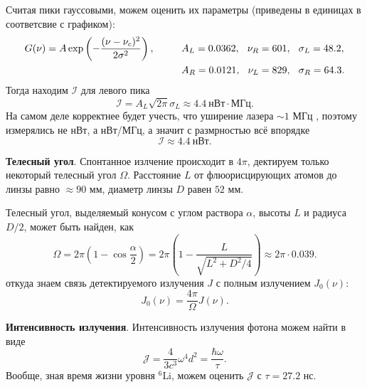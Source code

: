 Считая пики гауссовыми, можем оценить их параметры (приведены в единицах в соответсвие с графиком):
\begin{align*}
	G(\nu) = A \exp\left(- \frac{(\nu-\nu_c)^2}{2 \sigma^2}\right),
	\hspace{10 mm} 
	&A_L = 0.0362,
	\hspace{2.5 mm} 
	\nu_R = 601, 
	\hspace{2.5 mm} 
	\sigma_L = 48.2, \\
	&A_R = 0.0121,
	\hspace{2.5 mm} 
	\nu_L = 829,
	\hspace{2.5 mm} 
	\sigma_R = 64.3.
\end{align*}
Тогда находим $\mathcal I$ для левого пика
\begin{equation*}
	\mathcal{I} = A_L \sqrt{2 \pi} \sigma_L \approx 4.4 \ \text{нВт}\cdot\text{МГц}.
\end{equation*}
На самом деле корректнее будет учесть, что уширение лазера $\sim 1$ МГц , поэтому измерялись не нВт, а нВт/МГц, а значит с размрностью всё впорядке
\begin{equation*}
	\mathcal{I} \approx 4.4\ \text{нВт}. 
\end{equation*}


\textbf{Телесный угол}. Спонтанное излчение происходит в $4 \pi$, дектируем только некоторый телесный угол $\Omega$. 
Расстояние $L$ от флюорисцирующих атомов до линзы равно $\approx 90$ мм, диаметр линзы $D$ равен $52$ мм.

Телесный угол, выделяемый конусом с углом раствора $\alpha$, высоты $L$ и радиуса $D/2$, может быть найден, как
\begin{equation*}
	\Omega = 2 \pi \left(1 - \cos \frac{\alpha}{2}\right) = 2 \pi \left(1 - \frac{L}{\sqrt{L^2 + D^2/4}}\right) \approx	2 \pi \cdot 0.039.
\end{equation*}
откуда знаем связь детектируемого излучения $J$ с полным излучением $J_0(\nu)$:
\begin{equation*}
	J_0 (\nu) = \frac{4 \pi}{\Omega} J(\nu).
\end{equation*}

\textbf{Интенсивность излучения}. Интенсивность излучения фотона можем найти в виде
\begin{equation*}
	\mathcal J  = \frac{4}{3 c^3} \omega^4 d^2 = \frac{\hbar \omega}{\tau}.
\end{equation*}
Вообще, зная время жизни уровня ${}^6$Li, можем оценить $\mathcal J$ с $\tau = 27.2$ нс.

